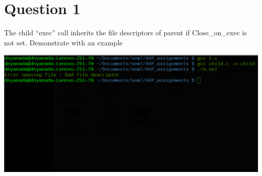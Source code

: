 \documentclass[main.tex]{subfiles}
\begin{document}
\section{Question 1}
The child ``exec'' call inherits the file descriptors of parent if Close\_on\_exec
is not set. Demonstrate with an example



\includegraphics[width=\textwidth]{figures/1_output.png}
\end{document}
